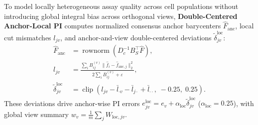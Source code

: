\documentclass[journal]{IEEEtran}
\begin{document}
To model locally heterogeneous assay quality across cell populations without introducing global integral bias across orthogonal views, \textbf{Double-Centered Anchor-Local PI} computes normalized consensus anchor barycenters $\hat{F}_{\mathrm{anc}}$, local cut mismatches $l_{jv}$, and anchor-and-view double-centered deviations $\tilde{\delta}_{jv}^{\mathrm{loc}}$:
\begin{equation}
\begin{aligned}
\hat{F}_{\mathrm{anc}} &= \operatorname{rownorm}(D_c^{-1} B_S^\top \hat{F}), \\
l_{jv} &= \frac{\sum_i B_{ij}^{(v)} \|\hat{f}_i - \hat{f}_{\mathrm{anc},j}\|_2^2}{2\sum_i B_{ij}^{(v)} + \varepsilon}, \\
\tilde{\delta}_{jv}^{\mathrm{loc}} &= \operatorname{clip}\!\left(l_{jv} - \bar{l}_{\cdot v} - \bar{l}_{j\cdot} + \bar{l}_{\cdot\cdot},\; -0.25,\; 0.25\right).
\end{aligned}
\label{eq:p2_local}
\end{equation}
These deviations drive anchor-wise PI errors $e_{jv}^{\mathrm{loc}} = e_v + \alpha_{\mathrm{loc}} \tilde{\delta}_{jv}^{\mathrm{loc}}$ ($\alpha_{\mathrm{loc}} = 0.25$), with global view summary $w_v = \frac{1}{m}\sum_j W_{\mathrm{loc},jv}$.
\end{document}
